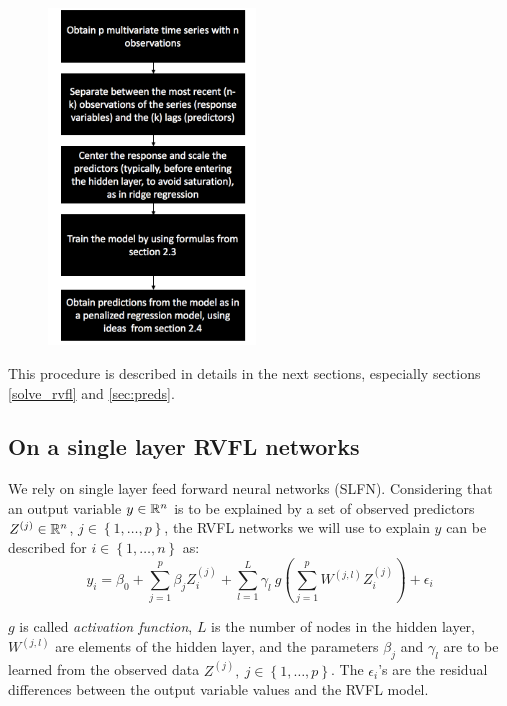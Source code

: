 \begin{figure}[!htb]
\centering
\includegraphics[width=5.5cm]{gfx/chapter-rvfl-mts/flowchart}
\caption{}
\label{fig:flowchart}
\end{figure}


This procedure is described in details in the next sections, especially sections \ref{solve_rvfl} and \ref{sec:preds}.

\clearpage

\subsection{On a single layer RVFL networks}
\label{sec:modeldesc}

We rely on single layer feed forward neural networks (SLFN).
Considering that an output variable $y \in \mathbb{R}^n$ is to be explained by a set of observed predictors $Z^{(j)} \in \mathbb{R}^n$, $j \in \left\lbrace 1, \ldots,
p\right\rbrace$, the RVFL networks we will use to explain $y$ can be described for $i \in \left\lbrace 1, \ldots, n\right\rbrace$ as:
$$
y_i = \beta_0 + \sum_{j = 1}^p \beta_j Z_i^{(j)} + \sum_{l = 1}^L \gamma_l \:
g\left(\sum_{j = 1}^p W^{(j, l)} Z_i^{(j)}\right) + \epsilon_i
$$

\medskip

$g$ is called \textit{activation function}, $L$ is the number of nodes in the hidden
layer, $W^{(j, l)}$ are elements of the hidden layer, and the parameters
$\beta_j$ and $\gamma_l$ are to be learned from the observed data $Z^{(j)}, \: j
\in \left\lbrace 1, \ldots, p\right\rbrace$. The $\epsilon_i$'s are the residual
differences between the output variable values and the RVFL model.

\medskip

